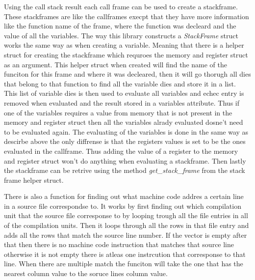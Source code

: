 Using the call stack result each call frame can be used to create a stackframe.
These stackframes are like the callframes execpt that they have more information like the function name of the frame, where the function was decleard and the value of all the variables.
The way this library  constructs a \emph{StackFrame} struct works the same way as when creating a variable.
Meaning that there is a helper struct for creating the stackframe which requroes the memory and register struct as an argument.
This helper struct when created will find the name of the funciton for this frame and where it was decleared, then it will go thorugh all dies that belong to that function to find all the variable dies and store it in a list.
This list of variable dies is then used to evaluate all variables and echec entry is removed when evaluated and the result stored in a variables attribute.
Thus if one of the variables requires a value from memory that is not present in the memory and register struct then all the variables alrady evaluated dosne't need to be evaluated again.
The evaluating of the variables is done in the same way as descirbe above the only diffrense is that the registers values is set to be the ones evaluated in the callframe.
Thus adding the value of a register to the memory and register struct won't do anything when evaluating a stackframe.
Then lastly the stackframe can be retrive using the method \emph{get\_stack\_frame} from the stack frame helper struct.


There is also a function for finding out what machine code addres a certain line in a source file correspondse to.
It works by first finding out which compilation unit that the source file corresponse to by looping trough all the file entries in all of the compilation units. 
Then it loops through all the rows in that file entry and adds all the rows that match the source line number.
If the vector is empty after that then there is no machine code instruction that matches that source line otherwise it is not empty there is atleas one instrcution that corresponse to that line.
When there are multiple match the funciton will take the one that has the nearest column value to the soruce lines column value.

